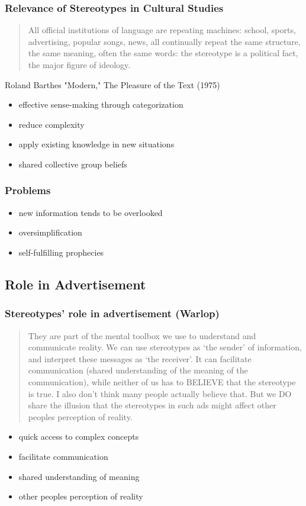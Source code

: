 \documentclass{beamer}
\begin{document}
\begin{frame}
 \frametitle{Relevance of Stereotypes in Cultural Studies}
 \begin{quotation} 
   All official institutions of language are repeating machines: school, sports, advertising, popular songs, news, all continually repeat the same structure, the same meaning, often the same words: the stereotype is a political fact, the major figure of ideology.\\
 \end{quotation}
 Roland Barthes "Modern," The Pleasure of the Text (1975)
\end{frame}

\begin{frame}
 \begin{itemize}
 \frametitle{Benefits}
  \item effective sense-making through categorization
  \item reduce complexity
  \item apply existing knowledge in new situations
  \item shared collective group beliefs
 \end{itemize}
\end{frame}

\begin{frame}
 \frametitle{Problems}
 \begin{itemize}
  \item new information tends to be overlooked
  \item oversimplification
  \item self-fulfilling prophecies
 \end{itemize}
\end{frame}

\subsection{Role in Advertisement}

\begin{frame}
 \frametitle{Stereotypes' role in advertisement (Warlop)}
 \begin{quotation}
They are part of the mental toolbox we use to understand and communicate reality. We can use stereotypes as `the sender' of information, and interpret these messages as `the receiver'.  It can facilitate communication (shared understanding of the meaning of the communication), while neither of us has to BELIEVE that the stereotype is true. I also don't think many people actually believe that. But we DO share the illusion that the stereotypes in such ads might affect other peoples perception of reality.   
 \end{quotation}
 \begin{itemize}
  \item quick access to complex concepts
  \item facilitate communication
  \item shared understanding of meaning
  \item other peoples perception of reality
 \end{itemize}
\end{frame}
\end{document}

